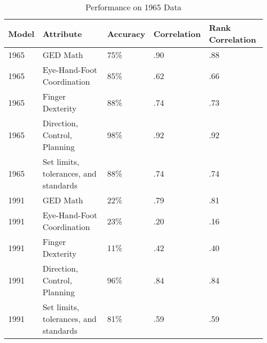 \documentclass[11pt]{article}
\begin{document}
\begin{table}[h!]
  \caption{Performance on 1965 Data}
\begin{tabular}{|l|l|l|l|l|}
\hline
\textbf{Model} & \textbf{Attribute}                    & \textbf{Accuracy} & \textbf{Correlation} & \textbf{Rank Correlation} \\ \hline
1965           & GED Math                              & 75\%              & .90                  & .88                       \\ \hline
1965           & Eye-Hand-Foot Coordination            & 85\%              & .62                  & .66                       \\ \hline
1965           & Finger Dexterity                      & 88\%              & .74                  & .73                       \\ \hline
1965           & Direction, Control, Planning          & 98\%              & .92                  & .92                       \\ \hline
1965           & Set limits, tolerances, and standards & 88\%              & .74                  & .74                       \\ \hline
1991           & GED Math                              & 22\%              & .79                  & .81                       \\ \hline
1991           & Eye-Hand-Foot Coordination            & 23\%              & .20                  & .16                       \\ \hline
1991           & Finger Dexterity                      & 11\%              & .42                  & .40                       \\ \hline
1991           & Direction, Control, Planning          & 96\%              & .84                  & .84                       \\ \hline
1991           & Set limits, tolerances, and standards & 81\%              & .59                  & .59                       \\ \hline
\end{tabular}
\end{table}
\end{document}

